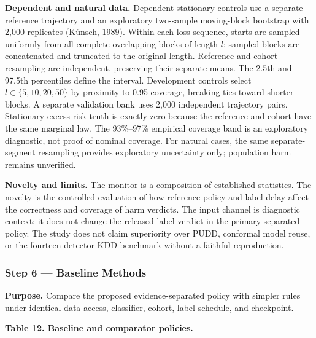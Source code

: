 \documentclass[
]{article}
\begin{document}
\textbf{Dependent and natural data.} Dependent stationary controls use a
separate reference trajectory and an exploratory two-sample moving-block
bootstrap with 2,000 replicates (Künsch, 1989). Within each loss
sequence, starts are sampled uniformly from all complete overlapping
blocks of length \(l\); sampled blocks are concatenated and truncated to
the original length. Reference and cohort resampling are independent,
preserving their separate means. The 2.5th and 97.5th percentiles define
the interval. Development controls select \(l\in\{5,10,20,50\}\) by
proximity to 0.95 coverage, breaking ties toward shorter blocks. A
separate validation bank uses 2,000 independent trajectory pairs.
Stationary excess-risk truth is exactly zero because the reference and
cohort have the same marginal law. The 93\%--97\% empirical coverage
band is an exploratory diagnostic, not proof of nominal coverage. For
natural cases, the same separate-segment resampling provides exploratory
uncertainty only; population harm remains unverified.

\textbf{Novelty and limits.} The monitor is a composition of established
statistics. The novelty is the controlled evaluation of how reference
policy and label delay affect the correctness and coverage of harm
verdicts. The input channel is diagnostic context; it does not change
the released-label verdict in the primary separated policy. The study
does not claim superiority over PUDD, conformal model reuse, or the
fourteen-detector KDD benchmark without a faithful reproduction.

\hypertarget{step-6-baseline-methods}{%
\subsubsection{Step 6 --- Baseline
Methods}\label{step-6-baseline-methods}}

\textbf{Purpose.} Compare the proposed evidence-separated policy with
simpler rules under identical data access, classifier, cohort, label
schedule, and checkpoint.

\textbf{Table 12. Baseline and comparator policies.}
\end{document}

